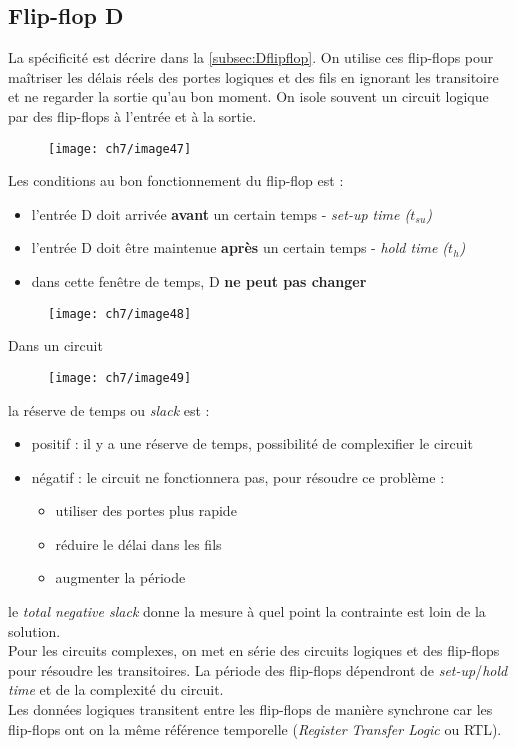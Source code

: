 \subsection{Flip-flop D}
La spécificité est décrire dans la \autoref{subsec:Dflipflop}. On utilise ces flip-flops pour maîtriser les délais réels des portes logiques et des fils en ignorant les transitoire et ne regarder la sortie qu'au bon moment. On isole souvent un circuit logique par des flip-flops à l'entrée et à la sortie.
\begin{figure}[H]
	\centering
	\texttt{[image: ch7/image47]}
\end{figure}
Les conditions au bon fonctionnement du flip-flop est :
\begin{itemize}
	\item l'entrée D doit arrivée \textbf{avant} un certain temps - \emph{set-up time ($t_{su}$)}
	\item l'entrée D doit être maintenue \textbf{après} un certain temps - \emph{hold time ($t_h$)}
	\item dans cette fenêtre de temps, D \textbf{ne peut pas changer}
\end{itemize}
\begin{figure}[H]
	\centering
	\texttt{[image: ch7/image48]}
\end{figure}
Dans un circuit 
\begin{figure}[H]
	\centering
	\texttt{[image: ch7/image49]}
\end{figure}
la réserve de temps ou \emph{slack} est :
\begin{itemize}
	\item positif : il y a une réserve de temps, possibilité de complexifier le circuit
	\item négatif : le circuit ne fonctionnera pas, pour résoudre ce problème :
	\begin{itemize}
		\item utiliser des portes plus rapide
		\item réduire le délai dans les fils
		\item augmenter la période
	\end{itemize}
\end{itemize}
le \emph{total negative slack} donne la mesure à quel point la contrainte est loin de la solution.\\

Pour les circuits complexes, on met en série des circuits logiques et des flip-flops pour résoudre les transitoires. La période des flip-flops dépendront de \textit{set-up}/\textit{hold time} et de la complexité du circuit.\\
Les données logiques transitent entre les flip-flops de manière synchrone car les flip-flops ont on la même référence temporelle (\textit{Register Transfer Logic} ou RTL).\\

